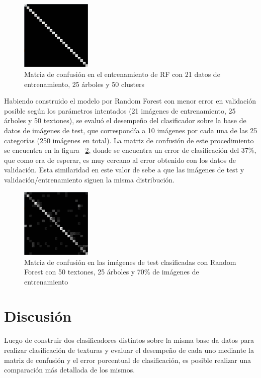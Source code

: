 \documentclass[10pt,twocolumn,letterpaper]{article}
\begin{document}
\begin{figure}[h]
    \centering
    \includegraphics[width=0.3\textwidth]{ConfusionEntrenamientoRF.jpg}
    \caption{Matriz de confusión en el entrenamiento de RF con 21 datos de entrenamiento, 25 árboles y 50 clusters}
    \label{fig:ConfusionEntrenamientoRF}
\end{figure}

Habiendo construido el modelo por Random Forest con menor error en validación posible según los parámetros intentados (21 imágenes de entrenamiento, 25 árboles y 50 textones), se evaluó el desempeño del clasificador sobre la base de datos de imágenes de test, que correspondía a 10 imágenes por cada una de las 25 categorías (250 imágenes en total). La matriz de confusión de este procedimiento se encuentra en la figura ~\ref{fig:confusionTestRF}, donde se encuentra un error de clasificación del 37\%, que como era de esperar, es muy cercano al error obtenido con los datos de validación. Esta similaridad en este valor de sebe a que las imágenes de test y validación/entrenamiento siguen la misma distribución.

\begin{figure}[h]
    \centering
    \includegraphics[width=0.3\textwidth]{ConfusionTestRF.jpg}
    \caption{Matriz de confusión en las imágenes de test clasificadas con Random Forest con 50 textones, 25 árboles y 70\% de imágenes de entrenamiento}
    \label{fig:confusionTestRF}
\end{figure}
\section{Discusión}
Luego de construir dos clasificadores distintos sobre la misma base da datos para realizar clasificación de texturas y evaluar el desempeño de cada uno mediante la matriz de confusión y el error porcentual de clasificación, es posible realizar una comparación más detallada de los mismos.
\end{document}
